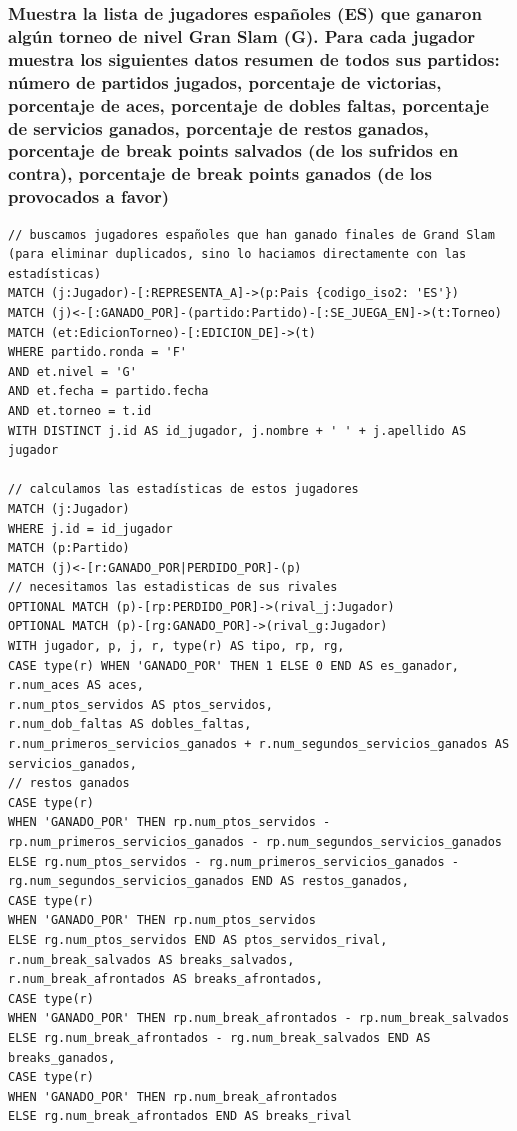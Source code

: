 \subsubsection{Muestra la lista de jugadores españoles (ES) que ganaron algún torneo de nivel Gran Slam (G). Para cada jugador muestra los siguientes datos resumen de todos sus partidos: número de partidos jugados, porcentaje de victorias, porcentaje de aces, porcentaje de dobles faltas, porcentaje de servicios ganados, porcentaje de restos ganados, porcentaje de break points salvados (de los sufridos en contra), porcentaje de break points ganados (de los provocados a favor)}

\begin{verbatim}
// buscamos jugadores españoles que han ganado finales de Grand Slam (para eliminar duplicados, sino lo haciamos directamente con las estadísticas)
MATCH (j:Jugador)-[:REPRESENTA_A]->(p:Pais {codigo_iso2: 'ES'})
MATCH (j)<-[:GANADO_POR]-(partido:Partido)-[:SE_JUEGA_EN]->(t:Torneo)
MATCH (et:EdicionTorneo)-[:EDICION_DE]->(t)
WHERE partido.ronda = 'F'
AND et.nivel = 'G'
AND et.fecha = partido.fecha
AND et.torneo = t.id
WITH DISTINCT j.id AS id_jugador, j.nombre + ' ' + j.apellido AS jugador

// calculamos las estadísticas de estos jugadores
MATCH (j:Jugador)
WHERE j.id = id_jugador
MATCH (p:Partido)
MATCH (j)<-[r:GANADO_POR|PERDIDO_POR]-(p)
// necesitamos las estadisticas de sus rivales
OPTIONAL MATCH (p)-[rp:PERDIDO_POR]->(rival_j:Jugador)
OPTIONAL MATCH (p)-[rg:GANADO_POR]->(rival_g:Jugador)
WITH jugador, p, j, r, type(r) AS tipo, rp, rg,
CASE type(r) WHEN 'GANADO_POR' THEN 1 ELSE 0 END AS es_ganador,
r.num_aces AS aces,
r.num_ptos_servidos AS ptos_servidos,
r.num_dob_faltas AS dobles_faltas,
r.num_primeros_servicios_ganados + r.num_segundos_servicios_ganados AS servicios_ganados,
// restos ganados
CASE type(r)
WHEN 'GANADO_POR' THEN rp.num_ptos_servidos - rp.num_primeros_servicios_ganados - rp.num_segundos_servicios_ganados
ELSE rg.num_ptos_servidos - rg.num_primeros_servicios_ganados - rg.num_segundos_servicios_ganados END AS restos_ganados,
CASE type(r)
WHEN 'GANADO_POR' THEN rp.num_ptos_servidos
ELSE rg.num_ptos_servidos END AS ptos_servidos_rival,
r.num_break_salvados AS breaks_salvados,
r.num_break_afrontados AS breaks_afrontados,
CASE type(r)
WHEN 'GANADO_POR' THEN rp.num_break_afrontados - rp.num_break_salvados
ELSE rg.num_break_afrontados - rg.num_break_salvados END AS breaks_ganados,
CASE type(r)
WHEN 'GANADO_POR' THEN rp.num_break_afrontados
ELSE rg.num_break_afrontados END AS breaks_rival


\end{verbatim}
